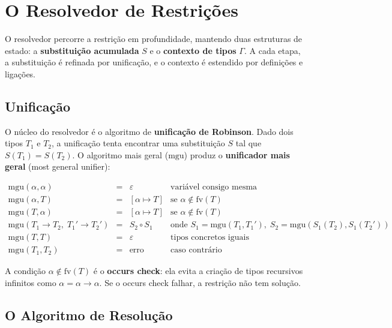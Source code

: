   \section{O Resolvedor de Restrições}

  O resolvedor percorre a restrição em profundidade, mantendo duas
  estruturas de estado: a \textbf{substituição acumulada} \(S\) e o
  \textbf{contexto de tipos} \(\Gamma\). A cada etapa, a substituição é
  refinada por unificação, e o contexto é estendido por definições e ligações.

  \subsection{Unificação}

  O núcleo do resolvedor é o algoritmo de \textbf{unificação de
  Robinson}. Dado dois tipos \(T_1\) e \(T_2\), a unificação tenta
  encontrar uma substituição \(S\) tal que \(S(T_1) = S(T_2)\). O
  algoritmo mais geral (\(\mathrm{mgu}\)) produz o \textbf{unificador
  mais geral} (most general unifier):

  \[
    \begin{array}{rcll} \mathrm{mgu}(\alpha, \alpha) & = & \varepsilon &
      \text{variável consigo mesma} \\ \mathrm{mgu}(\alpha, T) & = &
      [\alpha \mapsto
      T] & \text{se } \alpha \notin \mathrm{fv}(T) \\ \mathrm{mgu}(T,
      \alpha) & = &
      [\alpha \mapsto T] & \text{se } \alpha \notin \mathrm{fv}(T) \\
      \mathrm{mgu}(T_1 \to T_2,\; T_1' \to T_2') & = & S_2 \circ S_1 &
      \text{onde }
      S_1 = \mathrm{mgu}(T_1, T_1'),\; S_2 = \mathrm{mgu}(S_1(T_2),
      S_1(T_2')) \\
      \mathrm{mgu}(T, T) & = & \varepsilon & \text{tipos concretos iguais} \\
      \mathrm{mgu}(T_1, T_2) & = & \text{erro} & \text{caso contrário}
  \end{array} \]

  A condição \(\alpha \notin \mathrm{fv}(T)\) é o \textbf{occurs
  check}: ela evita a criação de tipos recursivos infinitos como
  \(\alpha = \alpha \to \alpha\). Se o occurs check falhar, a restrição
  não tem solução.

  \subsection{O Algoritmo de Resolução}

